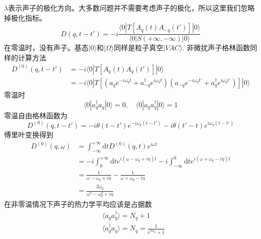 \documentclass[a4paper,14pt]{article}
\begin{document}
\begin{enumerate}
    $\lambda$表示声子的极化方向。大多数问题并不需要考虑声子的极化，所以这里我们忽略掉极化指标。
    \begin{equation*}
        D(q,t-t')=-i\frac{\langle0|T[A_{q}(t)A_{-q}(t')]|0\rangle}{\langle0|S(+\infty,-\infty)|0\rangle}
    \end{equation*}
    在零温时，没有声子。基态$|0\rangle$和$|\Omega\rangle$同样是粒子真空$|VAC\rangle$. 非微扰声子格林函数同样的计算方法
    \begin{equation*}
        \begin{split}
            D^{(0)}(q,t-t')&=-i\langle0|T[A_q(t)A_q(t')]|0\rangle\\
            &=-i\langle0|T[(a_qe^{-i\omega_qt}+a_{-q}^\dagger e^{i\omega_qt})(a_{-q}e^{-i\omega_qt'}+a_q^\dagger e^{i\omega_qt'})]|0\rangle
        \end{split}
    \end{equation*}
    零温时
    \begin{equation*}
        \langle0|a_q^\dagger a_q|0\rangle=0,\quad \langle0|a_q a_q^\dagger|0\rangle=1
    \end{equation*}
    零温自由格林函数为
    \begin{equation*}
        D^{(0)}(q,t-t')=-i\theta(t-t')e^{-i\omega_q(t-t')}-i\theta(t'-t)e^{i\omega_q(t-t')}
    \end{equation*}
    傅里叶变换得到
    \begin{equation*}
        \begin{split}
            D^{(0)}(q,\omega)&=\int_{-\infty}^{+\infty}\mathrm{d}t D^{(0)}(q,t)e^{i\omega t}\\
            &=-i\int_{0}^{+\infty}\mathrm{d}te^{i(\omega-\omega_q+i\eta)t}-i\int_{-\infty}^{0}\mathrm{d}te^{i(\omega+\omega_q-i\eta)t}\\
            &=\frac{1}{\omega-\omega_q+i\eta}-\frac{1}{\omega+\omega_q-i\eta}\\
            &=\frac{2\omega_q}{\omega^2-\omega_q^2+i\eta}
        \end{split}
    \end{equation*}
    在非零温情况下声子的热力学平均应该是占据数
    \begin{equation*}
        \begin{split}
            &\langle a_qa_q^\dagger\rangle=N_q+1\\
            &\langle a_q^\dagger a_q\rangle=N_q=\frac{1}{e^{\beta\omega_q}+1}
        \end{split}
    \end{equation*}

\end{enumerate}
\end{document}
